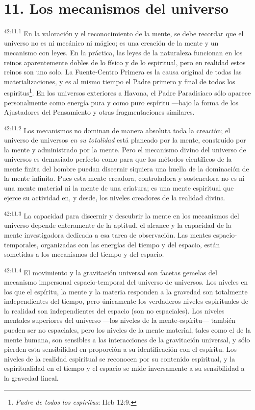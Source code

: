 \section*{11. Los mecanismos del universo}
\par
\textsuperscript{42:11.1} En la valoración y el reconocimiento de la mente, se debe recordar que el universo no es ni mecánico ni mágico; es una creación de la mente y un mecanismo con leyes. En la práctica, las leyes de la naturaleza funcionan en los reinos aparentemente dobles de lo físico y de lo espiritual, pero en realidad estos reinos son uno solo. La Fuente-Centro Primera es la causa original de todas las materializaciones, y es al mismo tiempo el Padre primero y final de todos los espíritus\footnote{\textit{Padre de todos los espíritus}: Heb 12:9.}. En los universos exteriores a Havona, el Padre Paradisiaco sólo aparece personalmente como energía pura y como puro espíritu ---bajo la forma de los Ajustadores del Pensamiento y otras fragmentaciones similares.

\par
\textsuperscript{42:11.2} Los mecanismos no dominan de manera absoluta toda la creación; el universo de universos \textit{en su totalidad} está planeado por la mente, construido por la mente y administrado por la mente. Pero el mecanismo divino del universo de universos es demasiado perfecto como para que los métodos científicos de la mente finita del hombre puedan discernir siquiera una huella de la dominación de la mente infinita. Pues esta mente creadora, controladora y sostenedora no es ni una mente material ni la mente de una criatura; es una mente espiritual que ejerce su actividad en, y desde, los niveles creadores de la realidad divina.

\par
\textsuperscript{42:11.3} La capacidad para discernir y descubrir la mente en los mecanismos del universo depende enteramente de la aptitud, el alcance y la capacidad de la mente investigadora dedicada a esa tarea de observación. Las mentes espacio-temporales, organizadas con las energías del tiempo y del espacio, están sometidas a los mecanismos del tiempo y del espacio.

\par
\textsuperscript{42:11.4} El movimiento y la gravitación universal son facetas gemelas del mecanismo impersonal espacio-temporal del universo de universos. Los niveles en los que el espíritu, la mente y la materia responden a la gravedad son totalmente independientes del tiempo, pero únicamente los verdaderos niveles espirituales de la realidad son independientes del espacio (son no espaciales). Los niveles mentales superiores del universo ---los niveles de la mente-espíritu--- también pueden ser no espaciales, pero los niveles de la mente material, tales como el de la mente humana, son sensibles a las interacciones de la gravitación universal, y sólo pierden esta sensibilidad en proporción a su identificación con el espíritu. Los niveles de la realidad espiritual se reconocen por su contenido espiritual, y la espiritualidad en el tiempo y el espacio se mide inversamente a su sensibilidad a la gravedad lineal.

